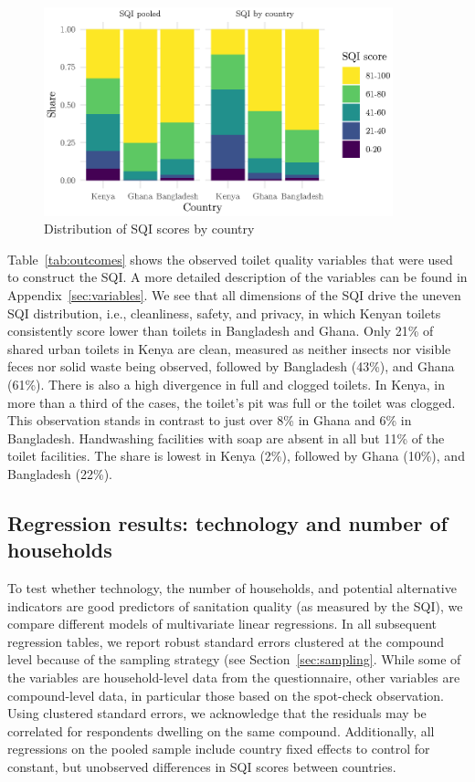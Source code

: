 \documentclass[natbib]{svjour3}                     %
\begin{document}
\begin{figure}[htbp]
    \centering
    \includegraphics[width=0.9\textwidth]{figures/sqi_ctry.eps}
    \caption{Distribution of SQI scores by country}
    \label{fig:sqi}
\end{figure}

Table~\ref{tab:outcomes} shows the observed toilet quality variables that were used to construct the SQI. A more detailed description of the variables can be found in Appendix~\ref{sec:variables}. We see that all dimensions of the SQI drive the uneven SQI distribution, i.e., cleanliness, safety, and privacy, in which Kenyan toilets consistently score lower than toilets in Bangladesh and Ghana. Only 21\% of shared urban toilets in Kenya are clean, measured as neither insects nor visible feces nor solid waste being observed, followed by Bangladesh (43\%), and Ghana (61\%). There is also a high divergence in full and clogged toilets. In Kenya, in more than a third of the cases, the toilet's pit was full or the toilet was clogged. This observation stands in contrast to just over 8\% in Ghana and 6\% in Bangladesh. Handwashing facilities with soap are absent in all but 11\% of the toilet facilities. The share is lowest in Kenya (2\%), followed by Ghana (10\%), and Bangladesh (22\%). 


\FloatBarrier

\subsection{Regression results: technology and number of households}

To test whether technology, the number of households, and potential alternative indicators are good predictors of sanitation quality (as measured by the SQI), we compare different models of multivariate linear regressions. In all subsequent regression tables, we report robust standard errors clustered at the compound level because of the sampling strategy (see Section~\ref{sec:sampling}. While some of the variables are household-level data from the questionnaire, other variables are compound-level data, in particular those based on the spot-check observation. Using clustered standard errors, we acknowledge that the residuals may be correlated for respondents dwelling on the same compound. Additionally, all regressions on the pooled sample include country fixed effects to control for constant, but unobserved differences in SQI scores between countries.
\end{document}
